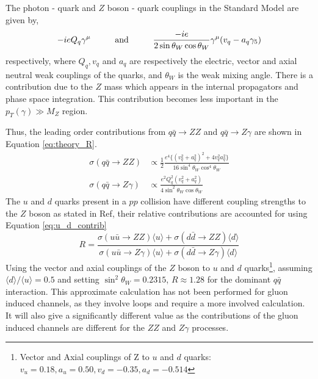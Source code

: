\documentclass[12pt,a4paper,openright,twoside]{report}
\begin{document}
The photon - quark and $Z$ boson - quark couplings in the Standard Model are given by,
\begin{equation}
	-ieQ_q\gamma^{\mu} \hspace{1 cm} \text{and} \hspace{1 cm}\frac{-ie}{2 \sin\theta_W \cos\theta_W}\gamma^{\mu}(v_q - a_q\gamma_5)
\end{equation}
respectively, where $Q_q,v_q$ and $a_q$ are respectively the electric, vector and axial neutral weak couplings of the quarks, and $\theta_W$ is the weak mixing angle. There is a contribution due to the $Z$ mass which appears in the internal propagators and phase space integration. This contribution becomes less important in the $p_T(\gamma)\gg M_Z$ region.

Thus, the leading order contributions from $q\bar{q}\rightarrow ZZ$ and $q\bar{q}\rightarrow Z\gamma$ are shown in Equation \ref{eq:theory_R}.
\begin{equation}
\begin{split}
	\sigma(q\bar{q}\rightarrow ZZ) &\propto \frac{1}{2}\frac{e^4\{(v_q^2 + a_q^2)^2 + 4v_q^2a_q^2\} }{16\sin^4\theta_W\cos^4\theta_W}\\[1.5ex]
	\sigma(q\bar{q}\rightarrow Z\gamma) &\propto \frac{e^2Q_q^2(v^2_q + a^2_q)}{4\sin^2\theta_W\cos\theta_W}
\end{split}
\label{eq:theory_R}
\end{equation}
The $u$ and $d$ quarks present in a $pp$ collision have different coupling strengths to the $Z$ boson as stated in Ref\cite{Z_coupling}, their relative contributions are accounted for using Equation \ref{eq:u_d_contrib}
\begin{equation}
R = \frac{\sigma(u\bar{u}\rightarrow ZZ)\langle u\rangle + \sigma(d\bar{d}\rightarrow ZZ)\langle d\rangle}{\sigma(u\bar{u}\rightarrow Z\gamma)\langle u\rangle + \sigma(d\bar{d}\rightarrow Z\gamma)\langle d\rangle}
\label{eq:u_d_contrib}
\end{equation}
Using the vector and axial couplings of the $Z$ boson to $u$ and $d$ quarks\footnote{Vector and Axial couplings of Z to $u$ and $d$ quarks: $v_u = 0.18, a_u = 0.50, v_d = -0.35, a_d = -0.514$}, assuming $\langle d \rangle/\langle u\rangle = 0.5$ and setting $\sin^2\theta_W = 0.2315$, $R\approx 1.28$ for the dominant $q\bar{q}$ interaction. This approximate calculation has not been performed for gluon induced channels, as they involve loops and require a more involved calculation. It will also give a significantly different value as the contributions of the gluon induced channels are different for the $ZZ$ and $Z\gamma$ processes.
\end{document}
